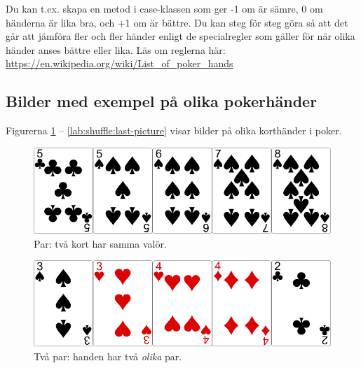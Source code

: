 Du kan t.ex. skapa en metod  i case-klassen  som ger -1 om  är sämre, 0 om händerna är lika bra, och +1 om  är bättre. Du kan steg för steg göra så att det går att jämföra fler och fler händer enligt de specialregler som gäller för när olika händer anses bättre eller lika. Läs om reglerna här: \url{https://en.wikipedia.org/wiki/List_of_poker_hands}



\subsection{Bilder med exempel på olika pokerhänder}\label{shuffle:hands}

Figurerna \ref{lab:shuffle:first-picture} -- \ref{lab:shuffle:last-picture} visar bilder på olika korthänder i poker.

\newcommand{\CardWidth}{0.5\textwidth}
\newcommand{\CardCaptionWidth}{0.3\textwidth}

\begin{figure}[H]
 \begin{minipage}[c]{\CardWidth}
  \includegraphics[width=\textwidth]{../img/w05-hands/pair.png}
 \end{minipage}
 \begin{minipage}[c]{\CardCaptionWidth}
  \caption{Par: två kort har samma valör.}
   \label{lab:shuffle:first-picture}
 \end{minipage}
\end{figure}

\begin{figure}[H]
 \begin{minipage}[c]{\CardWidth}
  \includegraphics[width=\textwidth]{../img/w05-hands/twopair.png}
 \end{minipage}
 \begin{minipage}[c]{\CardCaptionWidth}
  \caption{Två par: handen har två \emph{olika} par.}
 \end{minipage}
\end{figure}

